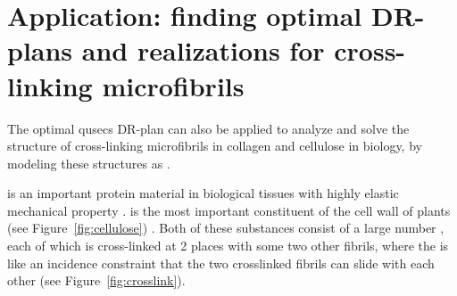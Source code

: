 \section{Application: finding optimal DR-plans and realizations for cross-linking microfibrils }
\label{sec:pinnedline}

The optimal qusecs DR-plan can also be applied to analyze and solve
the structure of  cross-linking microfibrils in collagen and cellulose
in biology, by modeling these structures as .

 is an important protein material in biological tissues with highly elastic mechanical property \cite{buehler2008nanomechanics}.
 is the most important constituent of the cell wall of plants (see Figure~\ref{fig:cellulose}) \cite{fall2013physical,smith1971plant}.
Both of these substances consist of a large number ,
each of which is cross-linked at 2 places with some two other fibrils,
where the  is like an incidence constraint that the
two crosslinked fibrils can slide with each other (see
Figure~\ref{fig:crosslink}).

%
%
%
%
%
%


